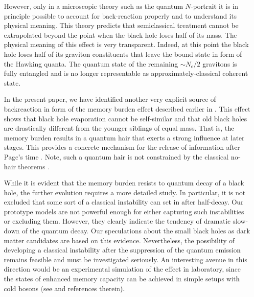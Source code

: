 \documentclass[aps,prd,reprint,superscriptaddress,nofootinbib]{revtex4-2}
\begin{document}
 However, only in a microscopic theory such as the quantum 
 $N$-portrait \cite{1112.3359} it is in principle possible to account for 
back-reaction properly and to understand its physical meaning. 
 This theory predicts \cite{Dvali:2013eja,Dvali:2012rt,Dvali:2012wq,Dvali:2013vxa,Dvali:2017eba} that semiclassical treatment cannot be extrapolated beyond the point when the black hole loses half of its mass. 
  The physical meaning of this effect  is very transparent. 
 Indeed, at this point the black hole loses half of its graviton constituents that leave the bound state 
in form of the Hawking quanta.  The quantum state of the remaining 
$\sim N_c/2$ gravitons is fully entangled and is no longer representable as approximately-classical coherent state. 
 
 In the present paper, we have identified another very explicit  source of backreaction in form of the memory burden effect described earlier 
 in \cite{1810.02336, 1812.08749}. 
  This effect shows that black hole evaporation cannot be self-similar
  and that old black holes are drastically different from the younger  
  siblings of equal mass.  That is, the memory burden results in 
  a quantum hair that exerts a  strong influence at later stages. This provides a concrete mechanism for the release of information after Page's time \cite{hep-th/9306083}.
  Note, such a  quantum hair is not constrained by the 
  classical no-hair theorems \cite{
   nohairRuffiniWheeler, 
   Hartle:1971qq,
   Bekenstein:1972ny, 
   Bekenstein:1971hc,
   PhysRev.D5.2403, 
   Teitelboim:1972pk,
   Teitelboim:1972ps}.  
  
  While it is evident that the memory burden resists to quantum decay of a black hole,  the further evolution requires a more detailed
 study.  In particular, it is not excluded that some sort of a classical instability 
 can set in after half-decay.  Our prototype models are not powerful enough for 
 either capturing such instabilities or excluding them.
  However, they clearly indicate the tendency 
 of dramatic slow-down of the quantum decay. Our speculations 
 about the small black holes as dark matter candidates are based
 on this evidence.  Nevertheless, the possibility of developing a 
 classical instability after the suppression of the 
 quantum emission  remains feasible and must be investigated 
seriously. An interesting avenue in this direction would be 
an experimental simulation of the effect in laboratory, since the states of enhanced memory capacity
can be achieved in simple setups with cold bosons (see \cite{1805.10292} and references therein). 
\end{document}
